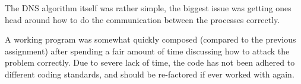 \documentclass[a4paper,11pt,oneside]{book}
\begin{document}
The DNS algorithm itself was rather simple, the biggest issue was getting ones head around how to do the communication between the processes correctly.

A working program was somewhat quickly composed (compared to the previous assignment) after spending a fair amount of time discussing how to attack the problem correctly. Due to severe lack of time, the code has not been adhered to different coding standards, and should be re-factored if ever worked with again.


\end{document}
